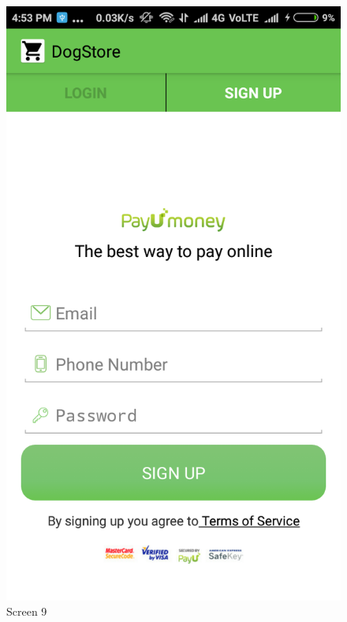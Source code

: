 \begin{figure}[ht]
\centering
\includegraphics[scale=0.30]{images/11.png}
\caption{Screen 9}
\end{figure}

\newpage

